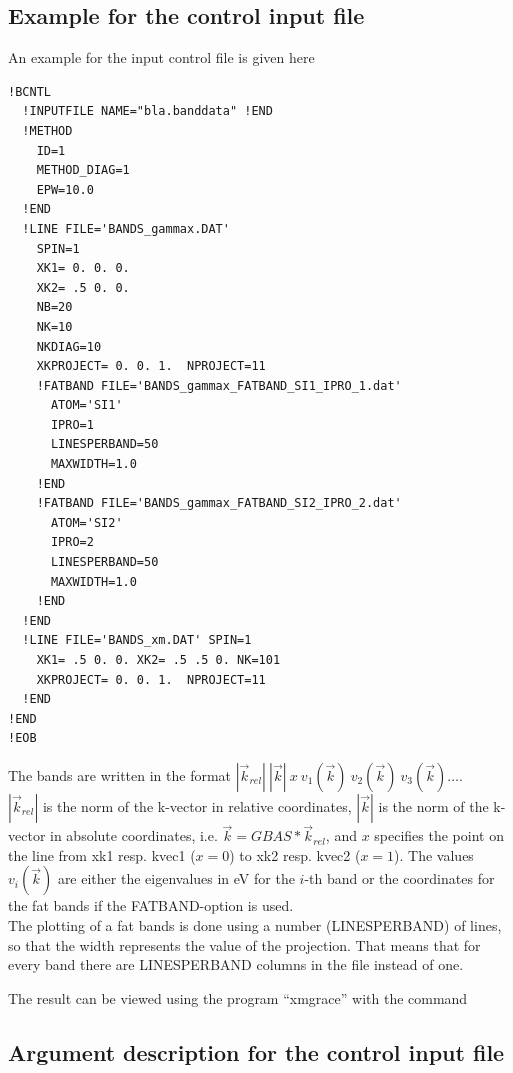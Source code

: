 \documentclass[final,12pt]{article}
\begin{document}
{{{\subsection{Example for the control input file}
An example for the input control file is given here
\begin{verbatim}
!BCNTL
  !INPUTFILE NAME="bla.banddata" !END
  !METHOD
    ID=1
    METHOD_DIAG=1
    EPW=10.0
  !END
  !LINE FILE='BANDS_gammax.DAT' 
    SPIN=1
    XK1= 0. 0. 0. 
    XK2= .5 0. 0. 
    NB=20
    NK=10
    NKDIAG=10
    XKPROJECT= 0. 0. 1.  NPROJECT=11 
    !FATBAND FILE='BANDS_gammax_FATBAND_SI1_IPRO_1.dat'
      ATOM='SI1'
      IPRO=1
      LINESPERBAND=50
      MAXWIDTH=1.0
    !END
    !FATBAND FILE='BANDS_gammax_FATBAND_SI2_IPRO_2.dat'
      ATOM='SI2'
      IPRO=2
      LINESPERBAND=50
      MAXWIDTH=1.0
    !END
  !END
  !LINE FILE='BANDS_xm.DAT' SPIN=1
    XK1= .5 0. 0. XK2= .5 .5 0. NK=101 
    XKPROJECT= 0. 0. 1.  NPROJECT=11 
  !END
!END
!EOB
\end{verbatim}

The bands are written in the format $|\vec k_{rel}|\ |\vec k|\ x\ v_1(\vec k)\ v_2(\vec k)\ v_3(\vec k) \ldots $.\\
 $|\vec k_{rel}|$ is the norm of the k-vector in relative coordinates, $|\vec k|$ is the norm of the  k-vector 
in absolute coordinates, i.e. $\vec k=GBAS*\vec k_{rel}$, and $x$ specifies the
point on the line from xk1 resp. kvec1 ($x=0$) to xk2 resp. kvec2 ($x=1$). The values $v_i(\vec k)$
are either the eigenvalues in eV for the $i$-th band or the coordinates 
for the fat bands if the FATBAND-option is used.\\
The plotting of a fat bands is done using a number (LINESPERBAND) of lines,
so that the width represents the value of the projection. That means that
for every band there are LINESPERBAND columns in the file instead of one.

The result can be viewed using the program ``xmgrace'' with the
command

\bigskip{}\bigskip


\subsection{Argument description for the control input file}

}}}
\end{document}
